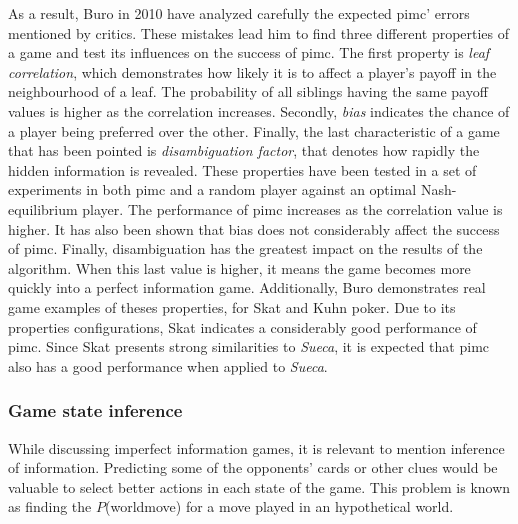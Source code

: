 As a result, Buro in 2010 have analyzed carefully the expected \gls{pimc}' errors mentioned by critics.
These mistakes lead him to find three different properties of a game and test its influences on the success of \gls{pimc}.
The first property is \emph{leaf correlation}, which demonstrates how likely it is to affect a player's payoff in the neighbourhood of a leaf.
The probability of all siblings having the same payoff values is higher as the correlation increases.
Secondly, \emph{bias} indicates the chance of a player being preferred over the other.
Finally, the last characteristic of a game that has been pointed is \emph{disambiguation factor}, that denotes how rapidly the hidden information is revealed.
These properties have been tested in a set of experiments in both \gls{pimc} and a random player against an optimal Nash-equilibrium player.
The performance of \gls{pimc} increases as the correlation value is higher.
It has also been shown that bias does not considerably affect the success of \gls{pimc}.
Finally, disambiguation has the greatest impact on the results of the algorithm.
When this last value is higher, it means the game becomes more quickly into a perfect information game.
Additionally, Buro demonstrates real game examples of theses properties, for Skat and Kuhn poker.
Due to its properties configurations, Skat indicates a considerably good performance of \gls{pimc}.
Since Skat presents strong similarities to \emph{Sueca}, it is expected that \gls{pimc} also has a good performance when applied to \emph{Sueca}.





\subsubsection{Game state inference}


While discussing imperfect information games, it is relevant to mention inference of information.
Predicting some of the opponents' cards or other clues would be valuable to select better actions in each state of the game.
This problem is known as finding the $P$(world\textbar move) for a move played in an hypothetical world.


